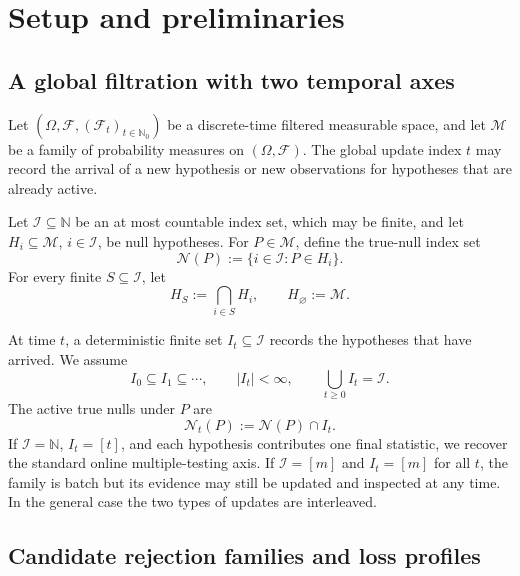 \documentclass[11pt]{article}
\numberwithin{equation}{section}
\theoremstyle{plain}
\theoremstyle{definition}
\newcommand{\N}{\mathbb N}
\newcommand{\Nzero}{\mathbb N_0}
\newcommand{\F}{\mathcal F}
\newcommand{\M}{\mathcal M}
\newcommand{\Iuniv}{\mathcal I}
\newcommand{\calN}{\mathcal N}
\begin{document}
\section{Setup and preliminaries}\label{sec:setup}

\subsection{A global filtration with two temporal axes}

Let $(\Omega,\F,(\F_t)_{t\in\Nzero})$ be a discrete-time filtered measurable space, and let $\M$ be a family of probability measures on $(\Omega,\F)$. The global update index $t$ may record the arrival of a new hypothesis or new observations for hypotheses that are already active.

Let $\Iuniv\subseteq\N$ be an at most countable index set, which may be finite, and let $H_i\subseteq\M$, $i\in\Iuniv$, be null hypotheses. For $P\in\M$, define the true-null index set
\begin{equation}\label{eq:true-nulls}
  \calN(P):=\{i\in\Iuniv:P\in H_i\}.
\end{equation}
For every finite $S\subseteq\Iuniv$, let
\begin{equation}\label{eq:intersection-null}
  H_S:=\bigcap_{i\in S}H_i,
  \qquad H_\varnothing:=\M.
\end{equation}

At time $t$, a deterministic finite set $I_t\subseteq\Iuniv$ records the hypotheses that have arrived. We assume
\begin{equation}\label{eq:active-sets}
  I_0\subseteq I_1\subseteq\cdots,
  \qquad |I_t|<\infty,
  \qquad \bigcup_{t\geq0}I_t=\Iuniv.
\end{equation}
The active true nulls under $P$ are
\begin{equation}\label{eq:active-true}
  \calN_t(P):=\calN(P)\cap I_t.
\end{equation}
If $\Iuniv=\N$, $I_t=[t]$, and each hypothesis contributes one final statistic, we recover the standard online multiple-testing axis. If $\Iuniv=[m]$ and $I_t=[m]$ for all $t$, the family is batch but its evidence may still be updated and inspected at any time. In the general case the two types of updates are interleaved.

\subsection{Candidate rejection families and loss profiles}
\end{document}
